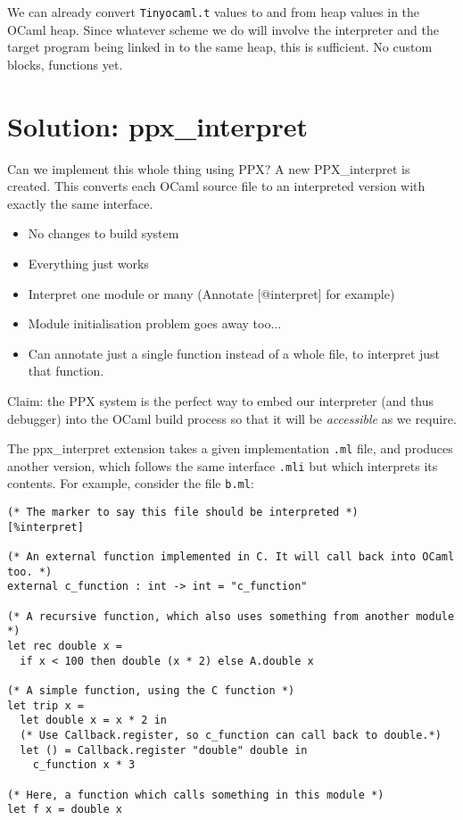 \documentclass[10pt]{article}
\begin{document}
We can already convert \texttt{Tinyocaml.t} values to and from heap values in the OCaml heap. Since whatever scheme we do will involve the interpreter and the target program being linked in to the same heap, this is sufficient. No custom blocks, functions yet.


\section*{Solution: \textsf{ppx\_interpret}}

Can we implement this whole thing using PPX? A new \textsf{PPX\_interpret} is created. This converts each OCaml source file to an interpreted version with exactly the same interface.

\begin{itemize}
\item No changes to build system
\item Everything just works
\item Interpret one module or many (Annotate [@interpret] for example)
\item Module initialisation problem goes away too...
\item Can annotate just a single function instead of a whole file, to interpret just that function.
\end{itemize}

\noindent Claim: the PPX system is the perfect way to embed our interpreter (and thus debugger) into the OCaml build process so that it will be \textit{accessible} as we require.


The \textsf{ppx\_interpret} extension takes a given implementation \texttt{.ml} file, and produces another version, which follows the same interface \texttt{.mli} but which interprets its contents. For example, consider the file \texttt{b.ml}:

{\small\begin{verbatim}
(* The marker to say this file should be interpreted *)
[%interpret]

(* An external function implemented in C. It will call back into OCaml too. *)
external c_function : int -> int = "c_function"

(* A recursive function, which also uses something from another module *)
let rec double x =
  if x < 100 then double (x * 2) else A.double x

(* A simple function, using the C function *)
let trip x =
  let double x = x * 2 in
  (* Use Callback.register, so c_function can call back to double.*)
  let () = Callback.register "double" double in
    c_function x * 3

(* Here, a function which calls something in this module *)
let f x = double x
\end{verbatim}}
\end{document}
